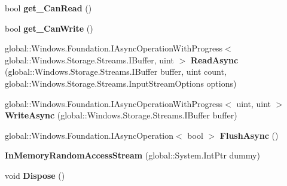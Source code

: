 \begin{DoxyCompactItemize}
bool {\bfseries get\+\_\+\+Can\+Read} ()
\item 
\mbox{\label{class_windows_1_1_storage_1_1_streams_1_1_in_memory_random_access_stream_a6130af7a8779a5e32ddb40559aed883d}} 
bool {\bfseries get\+\_\+\+Can\+Write} ()
\item 
\mbox{\label{class_windows_1_1_storage_1_1_streams_1_1_in_memory_random_access_stream_add150174cbde0a2405293e8765f70bd3}} 
global\+::\+Windows.\+Foundation.\+I\+Async\+Operation\+With\+Progress$<$ global\+::\+Windows.\+Storage.\+Streams.\+I\+Buffer, uint $>$ {\bfseries Read\+Async} (global\+::\+Windows.\+Storage.\+Streams.\+I\+Buffer buffer, uint count, global\+::\+Windows.\+Storage.\+Streams.\+Input\+Stream\+Options options)
\item 
\mbox{\label{class_windows_1_1_storage_1_1_streams_1_1_in_memory_random_access_stream_a812f40b23e43e9921ef7cc08a4bb0a58}} 
global\+::\+Windows.\+Foundation.\+I\+Async\+Operation\+With\+Progress$<$ uint, uint $>$ {\bfseries Write\+Async} (global\+::\+Windows.\+Storage.\+Streams.\+I\+Buffer buffer)
\item 
\mbox{\label{class_windows_1_1_storage_1_1_streams_1_1_in_memory_random_access_stream_a43197e973b559a363116945f30e5a6da}} 
global\+::\+Windows.\+Foundation.\+I\+Async\+Operation$<$ bool $>$ {\bfseries Flush\+Async} ()
\item 
\mbox{\label{class_windows_1_1_storage_1_1_streams_1_1_in_memory_random_access_stream_a58fe83e628070875813e711cb730b9e1}} 
{\bfseries In\+Memory\+Random\+Access\+Stream} (global\+::\+System.\+Int\+Ptr dummy)
\item 
\mbox{\label{class_windows_1_1_storage_1_1_streams_1_1_in_memory_random_access_stream_a46eac03da7bc9cadfb0e54b02113e49d}} 
void {\bfseries Dispose} ()
\item 
\mbox{\label{class_windows_1_1_storage_1_1_streams_1_1_in_memory_random_access_stream_aa647257f534704ae03fa50c86a98f839}} 

\end{DoxyCompactItemize}
